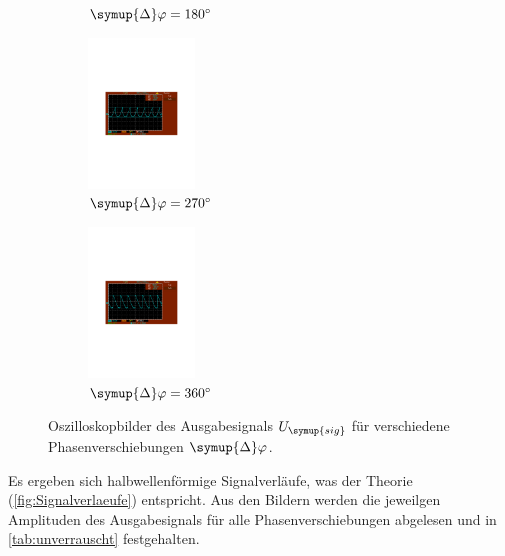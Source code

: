 \begin{figure} [H]
\begin{subfigure}{0.48\textwidth}
    \caption{$\symup{\Delta}\varphi = \qty{180}{\degree}$}
  \end{subfigure}
  \begin{subfigure}{0.48\textwidth}
    \centering
    \includegraphics[height=4cm]{content/Bilder/unverrauscht/270.pdf}
    \caption{$\symup{\Delta}\varphi = \qty{270}{\degree}$}
  \end{subfigure}
  \begin{subfigure}{0.48\textwidth}
    \centering
    \includegraphics[height=4cm]{content/Bilder/unverrauscht/360.pdf}
    \caption{$\symup{\Delta}\varphi = \qty{360}{\degree}$}
  \end{subfigure}
  \caption{Oszilloskopbilder des Ausgabesignals $U_{\symup{sig}}$ für verschiedene Phasenverschiebungen $\symup{\Delta}\varphi$.}
  \label{fig:Bilder normal}
\end{figure}

Es ergeben sich halbwellenförmige Signalverläufe, was der Theorie (\autoref{fig:Signalverlaeufe}) entspricht. 
Aus den Bildern werden die jeweilgen Amplituden des Ausgabesignals für alle Phasenverschiebungen abgelesen und
in \autoref{tab:unverrauscht} festgehalten.

